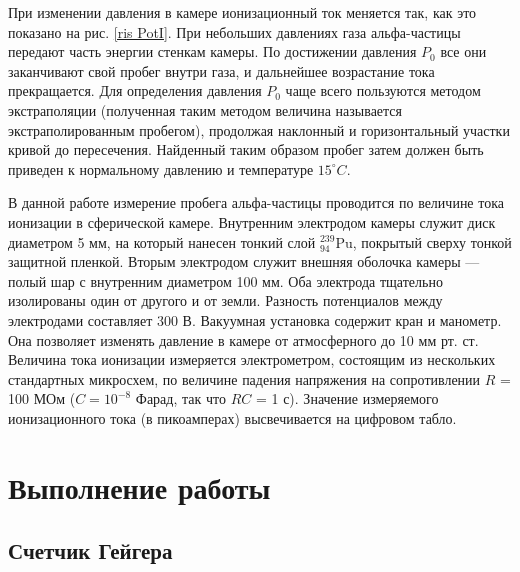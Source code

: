 \documentclass[a4paper, 12pt]{article}%
\begin{document}
	При изменении давления в камере ионизационный ток меняется так, как это показано на рис. \ref{ris PotI}. При небольших давлениях газа
	альфа-частицы передают часть энергии стенкам камеры. По достижении
	давления $ P_0 $ все они заканчивают свой пробег внутри газа, и дальнейшее возрастание тока прекращается. Для определения давления $ P_0 $ чаще всего пользуются методом экстраполяции (полученная таким методом величина называется экстраполированным пробегом), продолжая наклонный и горизонтальный участки кривой до пересечения. Найденный таким образом пробег затем должен быть приведен к нормальному давлению и температуре $ 15 ^\circ C $.
	
	В данной работе измерение пробега альфа-частицы проводится по величине тока ионизации в сферической камере. Внутренним электродом
	камеры служит диск диаметром 5 мм, на который нанесен тонкий слой $ ^{239}_{94} $Pu, покрытый сверху тонкой защитной пленкой. Вторым электродом служит внешняя оболочка камеры --- полый шар с внутренним
	диаметром 100 мм. Оба электрода тщательно изолированы один от
	другого и от земли. Разность потенциалов между электродами составляет 300 В. Вакуумная установка содержит кран и манометр. Она позволяет изменять давление в камере от атмосферного до 10 мм рт. ст.
	Величина тока ионизации измеряется электрометром, состоящим из
	нескольких стандартных микросхем, по величине падения напряжения
	на сопротивлении $ R $ = 100 МОм ($ C = 10^{-8} $ Фарад, так что $ RC $ = 1 с).
	Значение измеряемого ионизационного тока (в пикоамперах) высвечивается на цифровом табло.
	
	\section{Выполнение работы}
	
	\subsection{Счетчик Гейгера}
\end{document}
